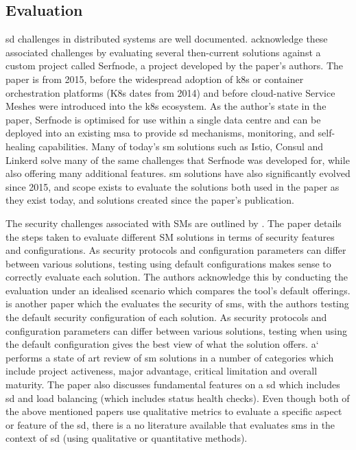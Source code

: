 \documentclass[12pt, a4paper, oneside]{article}
\begin{document}
\subsection{Evaluation}
\acrshort{sd} challenges in distributed systems are well documented. \cite{serfnode} acknowledge these associated challenges by evaluating several then-current solutions against a custom project called Serfnode, a project developed by the paper's authors. The paper is from 2015, before the widespread adoption of \acrshort{k8s} or container orchestration platforms (K8s dates from 2014) and before cloud-native Service Meshes were introduced into the \acrshort{k8s} ecosystem. As the author’s state in the paper, Serfnode is optimised for use within a single data centre and can be deployed into an existing \acrshort{msa} to provide \acrshort{sd} mechanisms, monitoring, and self-healing capabilities. Many of today’s \acrshort{sm} solutions such as Istio, Consul and Linkerd solve many of the same challenges that Serfnode was developed for, while also offering many additional features. \acrshort{sm} solutions have also significantly evolved since 2015, and scope exists to evaluate the solutions both used in the paper as they exist today, and solutions created since the paper’s publication.

The security challenges associated with SMs are outlined by \cite{mismesh}. The paper details the steps taken to evaluate different SM solutions in terms of security features and configurations. As security protocols and configuration parameters can differ between various solutions, testing using default configurations makes sense to correctly evaluate each solution. The authors acknowledge this by conducting the evaluation under an idealised scenario which compares the tool’s default offerings. \cite{mismesh} is another paper which the evaluates the security of \acrshort{sm}s, with the authors testing the default security configuration of each solution. As security protocols and configuration parameters can differ between various solutions, testing when using the default configuration gives the best view of what the solution offers. a`\cite{servicemesh} performs a state of art review of \acrshort{sm} solutions in a number of categories which include project activeness, major advantage, critical limitation and overall maturity. The paper also discusses fundamental features on a \acrshort{sd} which includes \acrshort{sd} and load balancing (which includes status health checks). Even though both of the above mentioned papers use qualitative metrics to evaluate a specific aspect or feature of the \acrshort{sd}, there is a no literature available that evaluates \acrshort{sm}s in the context of \acrshort{sd} (using qualitative or quantitative methods). 
\end{document}
